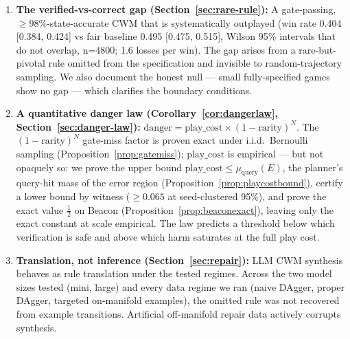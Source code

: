 \documentclass[11pt]{article}
\theoremstyle{remark}
\begin{document}
\begin{enumerate}
\item \textbf{The verified-vs-correct gap (Section~\ref{sec:rare-rule}):} A gate-passing, $\geq 98\%$-state-accurate CWM that is systematically outplayed (win rate 0.404 [0.384, 0.424] vs fair baseline 0.495 [0.475, 0.515], Wilson 95\% intervals that do not overlap, n=4800; 1.6 losses per win). The gap arises from a rare-but-pivotal rule omitted from the specification and invisible to random-trajectory sampling. We also document the honest null --- small fully-specified games show no gap --- which clarifies the boundary conditions.

\item \textbf{A quantitative danger law (Corollary~\ref{cor:dangerlaw}, Section~\ref{sec:danger-law}):} $\mathrm{danger} = \mathrm{play\_cost} \times (1 - \mathrm{rarity})^N$. The $(1 - \mathrm{rarity})^N$ gate-miss factor is proven exact under i.i.d.\ Bernoulli sampling (Proposition~\ref{prop:gatemiss}); $\mathrm{play\_cost}$ is empirical --- but not opaquely so: we prove the upper bound $\mathrm{play\_cost} \leq \mu_{\mathrm{query}}(E)$, the planner's query-hit mass of the error region (Proposition~\ref{prop:playcostbound}), certify a lower bound by witness ($\geq 0.065$ at seed-clustered 95\%), and prove the exact value $\tfrac12$ on Beacon (Proposition~\ref{prop:beaconexact}), leaving only the exact constant at scale empirical. The law predicts a threshold below which verification is safe and above which harm saturates at the full play cost.

\item \textbf{Translation, not inference (Section~\ref{sec:repair}):} LLM CWM synthesis behaves as rule translation under the tested regimes. Across the two model sizes tested (mini, large) and every data regime we ran (naive DAgger, proper DAgger, targeted on-manifold examples), the omitted rule was not recovered from example transitions. Artificial off-manifold repair data actively corrupts synthesis.


\end{enumerate}
\end{document}
